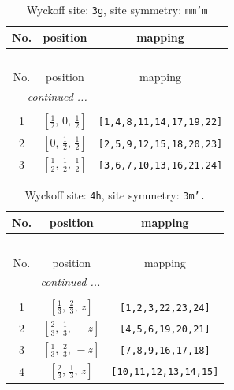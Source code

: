 \documentclass[fleqn,8pt]{jsarticle}
\begin{document}
\begin{longtable}{ccc}
\caption{Wyckoff site: {\tt 3g}, site symmetry: {\tt mm'm}}
 \\
 \hline \hline
No. & position & mapping \\ \hline \endfirsthead

\multicolumn{2}{l}{\tablename\ \thetable{}} \\
 \hline \hline
No. & position & mapping \\ \hline \endhead

 \hline \hline
\multicolumn{2}{r}{\footnotesize\it continued ...} \\ \endfoot

 \hline \hline
\multicolumn{2}{r}{} \\ \endlastfoot

1 & $\left[ \frac{1}{2},\, 0,\, \frac{1}{2} \right]$ & {\tt [1,4,8,11,14,17,19,22]} \\ \hline
2 & $\left[ 0,\, \frac{1}{2},\, \frac{1}{2} \right]$ & {\tt [2,5,9,12,15,18,20,23]} \\ \hline
3 & $\left[ \frac{1}{2},\, \frac{1}{2},\, \frac{1}{2} \right]$ & {\tt [3,6,7,10,13,16,21,24]} \\
\end{longtable}
\renewcommand{\arraystretch}{1.2}
\begin{longtable}{ccc}
\caption{Wyckoff site: {\tt 4h}, site symmetry: {\tt 3m'.}}
 \\
 \hline \hline
No. & position & mapping \\ \hline \endfirsthead

\multicolumn{2}{l}{\tablename\ \thetable{}} \\
 \hline \hline
No. & position & mapping \\ \hline \endhead

 \hline \hline
\multicolumn{2}{r}{\footnotesize\it continued ...} \\ \endfoot

 \hline \hline
\multicolumn{2}{r}{} \\ \endlastfoot

1 & $\left[ \frac{1}{3},\, \frac{2}{3},\, z \right]$ & {\tt [1,2,3,22,23,24]} \\ \hline
2 & $\left[ \frac{2}{3},\, \frac{1}{3},\, - z \right]$ & {\tt [4,5,6,19,20,21]} \\ \hline
3 & $\left[ \frac{1}{3},\, \frac{2}{3},\, - z \right]$ & {\tt [7,8,9,16,17,18]} \\ \hline
4 & $\left[ \frac{2}{3},\, \frac{1}{3},\, z \right]$ & {\tt [10,11,12,13,14,15]} \\
\end{longtable}
\end{document}
